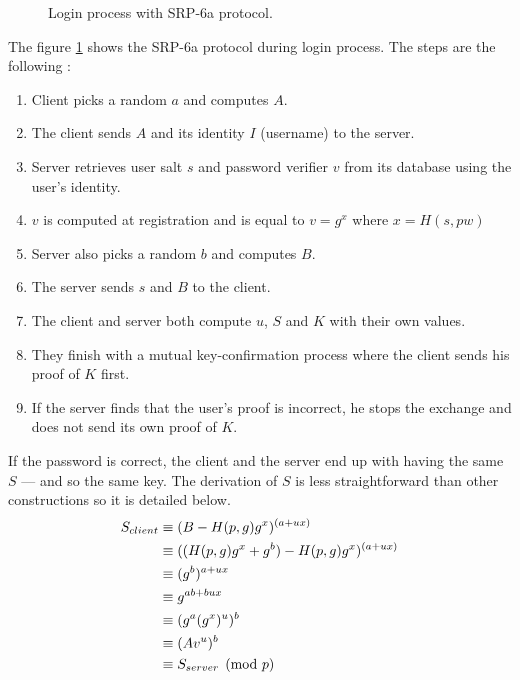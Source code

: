 ﻿\documentclass[../report.tex]{subfiles}
\begin{document}
\begin{figure}[h]
 \centering
 \setlength{\fboxsep}{10pt}
 \setlength{\fboxrule}{1pt}
 \caption{Login process with SRP-6a protocol.}
 \label{fig:SRP}
\end{figure}
The figure \ref{fig:SRP} shows the SRP-6a protocol during login process.
The steps are the following :
\begin{enumerate}
 \item Client picks a random $a$ and computes $A$.
 \item The client sends $A$ and its identity $I$ (username) to the server.
 \item Server retrieves user salt $s$ and password verifier $v$ from its database using the user's identity.
 \item $v$ is computed at registration and is equal to $v = g^x$ where $x = H(s, pw)$
 \item Server also picks a random $b$ and computes $B$.
 \item The server sends $s$ and $B$ to the client.
 \item The client and server both compute $u$, $S$ and $K$ with their own values.
 \item They finish with a mutual key-confirmation process where the client sends his proof of $K$ first.
 \item If the server finds that the user's proof is incorrect, he stops the exchange and does not send its own proof of $K$.
\end{enumerate}
If the password is correct, the client and the server end up with having the same $S$ --- and so the same key. The derivation of $S$ is less straightforward than other constructions so it is detailed below.
\begin{align*}
 S_{client}
 &\equiv (B - H(p, g) g^x)^{(a+ux)}\notag\\
 &\equiv ((H(p, g) g^x + g^b) - H(p, g) g^x)^{(a+ux)}\notag\\
 &\equiv (g^b)^{a+ux}\notag\\
 &\equiv g^{ab+bux}\notag\\
 &\equiv (g^a (g^x)^u)^b\notag\\
 &\equiv (Av^u)^b\notag\\
 &\equiv S_{server} \pmod{p}
\end{align*}
\end{document}
